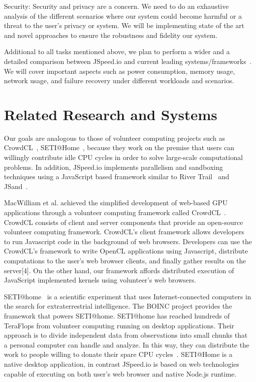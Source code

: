 \documentclass[10pt,reprint]{socc14}
\begin{document}
Security: Security and privacy are a concern. We need to do an exhaustive analysis of the different scenarios where our system could become harmful or a threat to the user’s privacy or system. We will be implementing state of the art and novel approaches to ensure the robustness and fidelity our system.

Additional to all tasks mentioned above, we plan to perform a wider and a detailed comparison between JSpeed.io and current leading systems/frameworks~\cite{Hadoop,GroppWilliamandLuskEwingandSkjellum1999}. We will cover important aspects such as power consumption, memory usage, network usage, and failure recovery under different workloads and scenarios.


\section{Related Research and Systems}
Our goals are analogous to those of volunteer computing projects such as CrowdCL~\cite{MacWilliam2013}, SETI@Home~\cite{Korpela2001a}, because they work on the premise that users can willingly contribute idle CPU cycles in order to solve large-scale computational problems.  In addition, JSpeed.io implements parallelism and sandboxing techniques using a JavaScript based framework similar to River Trail~\cite{Herhut2013a} and JSand~\cite{Agten2012}.

MacWilliam et al. achieved the simplified development of web-based GPU applications through a volunteer computing framework called CrowdCL~\cite{MacWilliam2013}. CrowdCL consists of client and server components that provide an open-source volunteer computing framework. CrowdCL’s client framework allows developers to run Javascript code in the background of web browsers. Developers can use the CrowdCL’s framework to write OpenCL applications using Javascript, distribute computations to the user's web browser clients, and finally gather results on the server[4]. On the other hand, our framework affords distributed execution of JavaScript implemented kernels using volunteer’s  web browsers. 

SETI@home~\cite{Korpela2001a} is a scientific experiment that uses Internet-connected computers in the search for extraterrestrial intelligence. The BOINC project provides the framework that powers SETI@home.  SETI@home has reached hundreds of TeraFlops from volunteer computing running on desktop applications. Their approach is to divide independent data from observations into small chunks that a personal computer can handle and analyze. In this way, they can distribute the work to people willing to donate their spare CPU cycles~\cite{Korpela2001a}. SETI@Home is a native desktop application, in contrast JSpeed.io is based on web technologies capable of executing on both user’s web browser and native Node.js runtime. 
\end{document}
